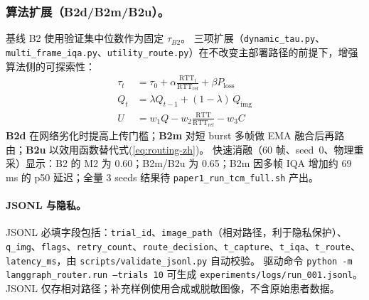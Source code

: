 \subsubsection{算法扩展（B2d/B2m/B2u）。}
基线 B2 使用验证集中位数作为固定 $\tau_{B2}$。
三项扩展（\texttt{dynamic\_tau.py}、\texttt{multi\_frame\_iqa.py}、\texttt{utility\_route.py}）在不改变主部署路径的前提下，增强算法侧的可探索性：
\begin{align}
\tau_t &= \tau_0 + \alpha \tfrac{\mathrm{RTT}_t}{\mathrm{RTT}_{\mathrm{ref}}} + \beta P_{\mathrm{loss}} \label{eq:dynamic-tau-zh}\\
Q_t &= \lambda Q_{t-1} + (1-\lambda)\, Q_{\mathrm{img}} \label{eq:ema-iqa-zh}\\
U &= w_1 Q - w_2 \tfrac{\mathrm{RTT}}{\mathrm{RTT}_{\mathrm{ref}}} - w_3 C \label{eq:utility-zh}
\end{align}
\textbf{B2d} 在网络劣化时提高上传门槛；\textbf{B2m} 对短 burst 多帧做 EMA 融合后再路由；\textbf{B2u} 以效用函数替代式(\ref{eq:routing-zh})。
快速消融（60 帧、seed~0、物理重采）显示：B2 的 M2 为 0.60；B2m/B2u 为 0.65；B2m 因多帧 IQA 增加约 69\,ms 的 p50 延迟；全量 3 seeds 结果待 \texttt{paper1\_run\_tcm\_full.sh} 产出。

\paragraph{JSONL 与隐私。}
JSONL 必填字段包括：\texttt{trial\_id}、\texttt{image\_path}（相对路径，利于隐私保护）、\texttt{q\_img}、\texttt{flags}、\texttt{retry\_count}、\texttt{route\_decision}、\texttt{t\_capture}、\texttt{t\_iqa}、\texttt{t\_route}、\texttt{latency\_ms}，由 \texttt{scripts/validate\_jsonl.py} 自动校验。
驱动命令 \texttt{python -m langgraph\_router.run --trials 10} 可生成 \texttt{experiments/logs/run\_001.jsonl}。
JSONL 仅存相对路径；补充样例使用合成或脱敏图像，不含原始患者数据。
